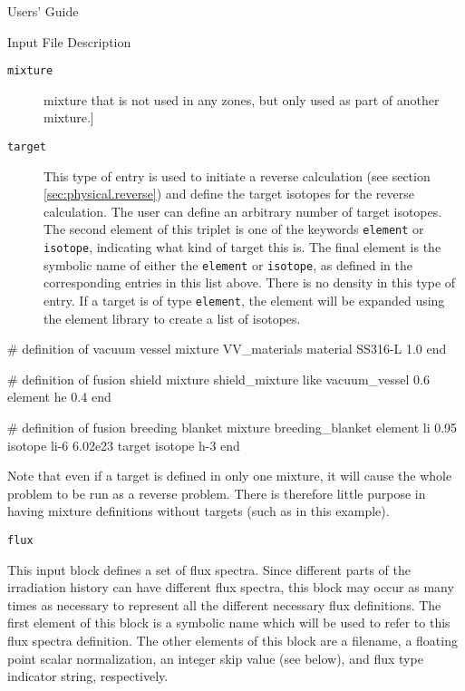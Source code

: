 \begin{chapter}{Users' Guide\label{app:user.guide}}
\begin{section}{Input File Description\label{app:user.input}}
\begin{subsection}{\texttt{mixture}\label{app:user.input.mix}}
\begin{description}
        mixture that is not used in any zones, but only used as part
        of another mixture.]
      \item[\texttt{target}] This type of entry is used to initiate a
        reverse calculation (see section \ref{sec:physical.reverse})
        and define the target isotopes for the reverse calculation.
        The user can define an arbitrary number of target isotopes.
        The second element of this triplet is one of the keywords
        \texttt{element} or \texttt{isotope}, indicating what kind of
        target this is.  The final element is the symbolic name of
        either the \texttt{element} or \texttt{isotope}, as defined in
        the corresponding entries in this list above.  There is no
        density in this type of entry.  If a target is of type
        \texttt{element}, the element will be expanded using the
        element library to create a list of isotopes.
      \end{description}
 
      \begin{center}
        \renewcommand{\baselinestretch}{1}\normalsize
        \begin{boxedverbatim}
# definition of vacuum vessel
mixture VV_materials
   material SS316-L 1.0
end

# definition of fusion shield
mixture shield_mixture
   like     vacuum_vessel  0.6
   element  he             0.4
end

# definition of fusion breeding blanket
mixture breeding_blanket
   element  li      0.95
   isotope  li-6    6.02e23
   target   isotope h-3
end
\end{boxedverbatim}
      \end{center}

      Note that even if a target is defined in only one mixture, it
      will cause the whole problem to be run as a reverse problem.
      There is therefore little purpose in having mixture definitions
      without targets (such as in this example).
    \end{subsection}

    \begin{subsection}{\texttt{flux}\label{app:user.input.flux}}
      
      This input block defines a set of flux spectra.  Since different
      parts of the irradiation history can have different flux
      spectra, this block may occur as many times as necessary to
      represent all the different necessary flux definitions.  The
      first element of this block is a symbolic name which will be
      used to refer to this flux spectra definition.  The other
      elements of this block are a filename, a floating point scalar
      normalization, an integer skip value (see below), and flux type
      indicator string, respectively.


\end{subsection}
\end{section}
\end{chapter}
